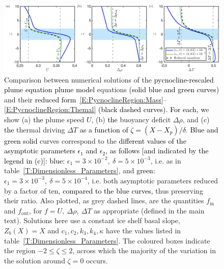 \documentclass[openacc]{rsproca_new}%
\newcommand{\red}[1]{{\color{red} #1}}
\newcommand{\blue}[1]{{\color{blue} #1}}
\newcommand{\rout}[1]{\red{\st{#1}}}\newcommand{\ab}[1]{\textcolor{Green}{#1}}\newcommand{\about}[1]{\textcolor{Cyan}{\sout{#1}}}
\renewcommand{\rout}[1]{{}} %
\renewcommand{\blue}[1]{{\textcolor{black}{#1}}} %
\renewcommand{\red}[1]{{}} %
\newcommand{\epsone}{\epsilon_{1}} %
\newcommand{\epstwo}{\epsilon_{2}} %
\newcommand{\lt}{\delta} %
\renewcommand{\in}{\text{in}} %
\newcommand{\out}{\text{out}}
\begin{document}
\begin{figure}
\centering
\includegraphics[width = \textwidth]{./make_plots/plots/figure4.png}
\caption{Comparison between numerical solutions of the \blue{pycnocline-rescaled plume equation} \blue{plume model} equations \rout{rescaled to the pycnocline}\blue{(solid blue and green curves)} and their \rout{leading order reduction }\blue{reduced form}~\eqref{E:PycnoclineRegion:Mass}--\eqref{E:PycnoclineRegion:Themal} \blue{(black dashed curves)}. \blue{For each,} \rout{W}\blue{w}e show (a) \blue{the} plume speed $U$, (b) \blue{the} buoyancy deficit $\Delta \rho$, and (c) \blue{the} thermal driving $\Delta T$ \blue{as a function of $\zeta = (X - X_p)/\delta$}. \blue{Blue and green solid}\rout{ Purple} curves correspond to the \blue{different values of the asymptotic parameters $\epsone$ and $\epstwo$, as follows [and indicated by the legend in (c)]:} \rout{full equations with} \blue{blue:} $\epsone = 3\times10^{-2}, ~\lt = 5\times10^{-3}$, i.e. as in table~\ref{T:Dimensionless_Parameters}, and \blue{green:} $\epsone = 3\times10^{-3},~ \lt = 5\times10^{-4}$, i.e. both asymptotic parameters reduced by a factor of ten\blue{, compared to the blue curves,} thus preserving their ratio. \rout{Black dashed curves correspond to the solution of the leading order equations.} Also plotted, as grey dashed lines, are the quantities $f_{\in}$ and $f_{\out}$, for $f = U,~ \Delta \rho, ~\Delta T$ as appropriate (defined in the main text). Solutions here use a constant ice shelf basal slope, $Z_b(X) = X$ and $c_1, c_2, k_3,k_4, \kappa$ have the values listed in table~\ref{T:Dimensionless_Parameters}. The coloured boxes indicate the region $-2 \leq \zeta  \leq 2$, across which the majority of the variation in the solution around $\zeta = 0 $ occurs.}\label{fig:PycnoclineAsymptotics}
\end{figure}
\end{document}
